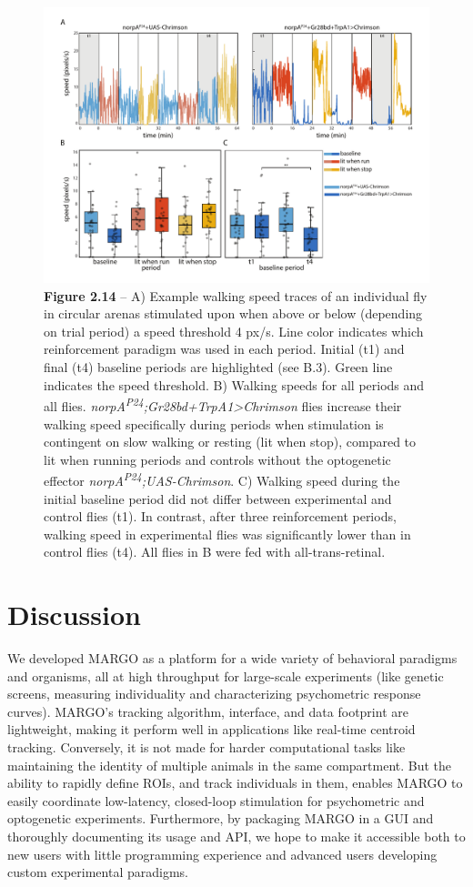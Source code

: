 \documentclass[12pt,letterpaper]{article}
\begin{document}
\begin{figure}[t!]
 \includegraphics[width=\textwidth]{../figures/chapter_2/fig_2-14.pdf}
\caption*{\textbf{Figure 2.14} --  A) Example walking speed traces of an individual fly in circular arenas stimulated upon when above or below (depending on trial period) a speed threshold 4 px/s. Line color indicates which reinforcement paradigm was used in each period. Initial (t1) and final (t4) baseline periods are highlighted (see B.3). Green line indicates the speed threshold. B) Walking speeds for all periods and all flies. \textit{norpA\textsuperscript{P24};Gr28bd+TrpA1>Chrimson} flies increase their walking speed specifically during periods when stimulation is contingent on slow walking or resting (lit when stop), compared to lit when running periods and controls without the optogenetic effector \textit{norpA\textsuperscript{P24};UAS-Chrimson}. C) Walking speed during the initial baseline period did not differ between experimental and control flies (t1). In contrast, after three reinforcement periods, walking speed in experimental flies was significantly lower than in control flies (t4). 
All flies in B were fed with all-trans-retinal.}
\end{figure}

\section*{Discussion}
We developed MARGO as a platform for a wide variety of behavioral paradigms and organisms, all at high throughput for large-scale experiments (like genetic screens, measuring individuality and characterizing psychometric response curves). MARGO's tracking algorithm, interface, and data footprint are lightweight, making it perform well in applications like real-time centroid tracking. Conversely, it is not made for harder computational tasks like maintaining the identity of multiple animals in the same compartment. But the ability to rapidly define ROIs, and track individuals in them, enables MARGO to easily coordinate low-latency, closed-loop stimulation for psychometric and optogenetic experiments. Furthermore, by packaging MARGO in a GUI and thoroughly documenting its usage and API, we hope to make it accessible both to new users with little programming experience and advanced users developing custom experimental paradigms.
\end{document}

